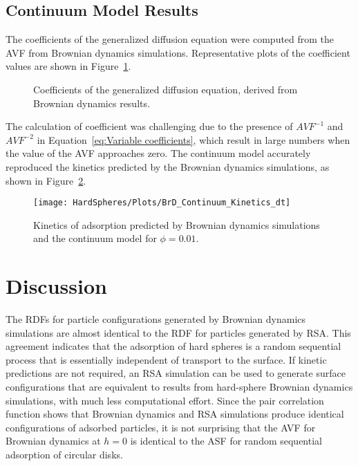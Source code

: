 \subsection{Continuum Model Results}

The coefficients of the generalized diffusion equation were computed
from the AVF from Brownian dynamics simulations. Representative plots
of the coefficient values are shown in Figure~\ref{fig:Coefficient Plots}.%
\begin{figure}[H]

\caption{\label{fig:Coefficient Plots}Coefficients of the generalized diffusion
equation, derived from Brownian dynamics results.}
%
\end{figure}
 The calculation of coefficient was challenging due to the presence
of $AVF^{-1}$ and $AVF^{-2}$ in Equation~\ref{eq:Variable coefficients},
which result in large numbers when the value of the AVF approaches
zero. The continuum model accurately reproduced the kinetics predicted
by the Brownian dynamics simulations, as shown in Figure~\ref{fig:Kinetics CFD BrD}.%
\begin{figure}
\texttt{[image: HardSpheres/Plots/BrD\_Continuum\_Kinetics\_dt]}

\caption{\label{fig:Kinetics CFD BrD}Kinetics of adsorption predicted by Brownian
dynamics simulations and the continuum model for $\phi=0.01$.}
%
\end{figure}



\section{Discussion}

The RDFs for particle configurations generated by Brownian dynamics
simulations are almost identical to the RDF for particles generated
by RSA. This agreement indicates that the adsorption of hard spheres
is a random sequential process that is essentially independent of
transport to the surface. If kinetic predictions are not required,
an RSA simulation can be used to generate surface configurations that
are equivalent to results from hard-sphere Brownian dynamics simulations,
with much less computational effort. Since the pair correlation function
shows that Brownian dynamics and RSA simulations produce identical
configurations of adsorbed particles, it is not surprising that the
AVF for Brownian dynamics at $h=0$ is identical to the ASF for random
sequential adsorption of circular disks.

